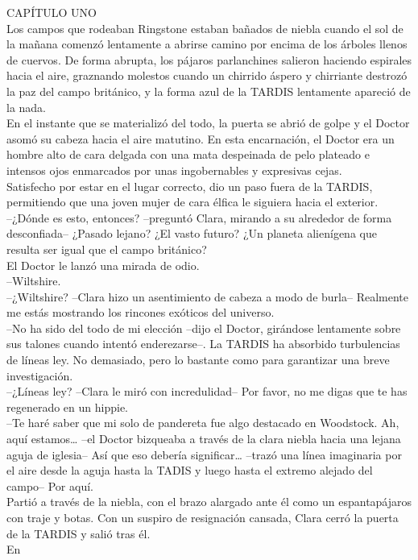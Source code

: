 {CAPÍTULO UNO\\
Los campos que rodeaban Ringstone estaban bañados de niebla cuando el
sol de la mañana comenzó lentamente a abrirse camino por encima de los
árboles llenos de cuervos. De forma abrupta, los pájaros parlanchines
salieron haciendo espirales hacia el aire, graznando molestos cuando un
chirrido áspero y chirriante destrozó la paz del campo británico, y la
forma azul de la TARDIS lentamente apareció de la nada.\\
En el instante que se materializó del todo, la puerta se abrió de golpe
y el Doctor asomó su cabeza hacia el aire matutino. En esta encarnación,
el Doctor era un hombre alto de cara delgada con una mata despeinada de
pelo plateado e intensos ojos enmarcados por unas ingobernables y
expresivas cejas.\\
Satisfecho por estar en el lugar correcto, dio un paso fuera de la
TARDIS, permitiendo que una joven mujer de cara élfica le siguiera hacia
el exterior.\\
--¿Dónde es esto, entonces? --preguntó Clara, mirando a su alrededor de
forma desconfiada-- ¿Pasado lejano? ¿El vasto futuro? ¿Un planeta
alienígena que resulta ser igual que el campo británico?\\
El Doctor le lanzó una mirada de odio.\\
--Wiltshire.\\
--¿Wiltshire? --Clara hizo un asentimiento de cabeza a modo de burla--
Realmente me estás mostrando los rincones exóticos del universo.\\
--No ha sido del todo de mi elección --dijo el Doctor, girándose
lentamente sobre sus talones cuando intentó enderezarse--. La TARDIS ha
absorbido turbulencias de líneas ley. No demasiado, pero lo bastante
como para garantizar una breve investigación.\\
--¿Líneas ley? --Clara le miró con incredulidad-- Por favor, no me digas
que te has regenerado en un hippie.\\
--Te haré saber que mi solo de pandereta fue algo destacado en
Woodstock. Ah, aquí estamos\ldots{} --el Doctor bizqueaba a través de la
clara niebla hacia una lejana aguja de iglesia-- Así que eso debería
significar\ldots{} --trazó una línea imaginaria por el aire desde la
aguja hasta la TADIS y luego hasta el extremo alejado del campo-- Por
aquí.\\
Partió a través de la niebla, con el brazo alargado ante él como un
espantapájaros con traje y botas. Con un suspiro de resignación cansada,
Clara cerró la puerta de la TARDIS y salió tras él.\\[2\baselineskip]En
}
